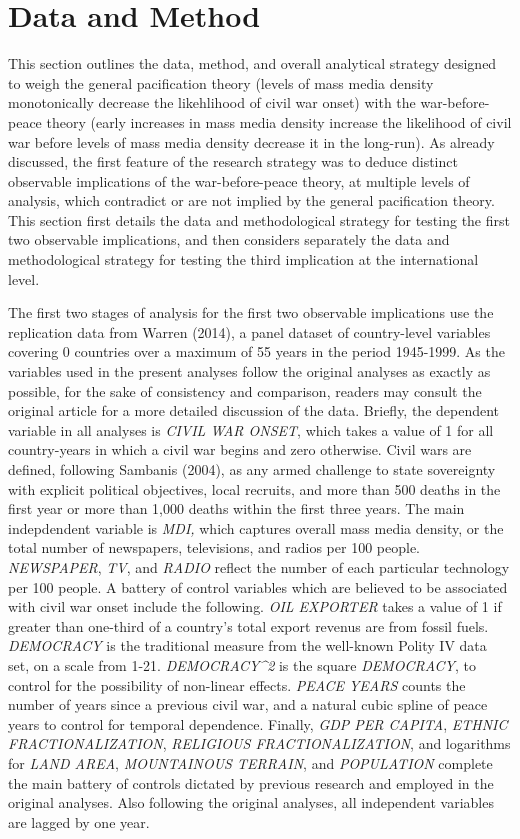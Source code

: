 \documentclass[11pt,article,oneside]{memoir}
\begin{document}
\section{Data and Method}\label{data-and-method}

This section outlines the data, method, and overall analytical strategy
designed to weigh the general pacification theory (levels of mass media
density monotonically decrease the likehlihood of civil war onset) with
the war-before-peace theory (early increases in mass media density
increase the likelihood of civil war before levels of mass media density
decrease it in the long-run). As already discussed, the first feature of
the research strategy was to deduce distinct observable implications of
the war-before-peace theory, at multiple levels of analysis, which
contradict or are not implied by the general pacification theory. This
section first details the data and methodological strategy for testing
the first two observable implications, and then considers separately the
data and methodological strategy for testing the third implication at
the international level.

The first two stages of analysis for the first two observable
implications use the replication data from Warren (2014), a panel
dataset of country-level variables covering 0 countries over a maximum
of 55 years in the period 1945-1999. As the variables used in the
present analyses follow the original analyses as exactly as possible,
for the sake of consistency and comparison, readers may consult the
original article for a more detailed discussion of the data. Briefly,
the dependent variable in all analyses is \emph{CIVIL WAR ONSET}, which
takes a value of 1 for all country-years in which a civil war begins and
zero otherwise. Civil wars are defined, following Sambanis (2004), as
any armed challenge to state sovereignty with explicit political
objectives, local recruits, and more than 500 deaths in the first year
or more than 1,000 deaths within the first three years. The main
indepdendent variable is \emph{MDI,} which captures overall mass media
density, or the total number of newspapers, televisions, and radios per
100 people. \emph{NEWSPAPER}, \emph{TV}, and \emph{RADIO} reflect the
number of each particular technology per 100 people. A battery of
control variables which are believed to be associated with civil war
onset include the following. \emph{OIL EXPORTER} takes a value of 1 if
greater than one-third of a country's total export revenus are from
fossil fuels. \emph{DEMOCRACY} is the traditional measure from the
well-known Polity IV data set, on a scale from 1-21.
\emph{DEMOCRACY\^{}2} is the square \emph{DEMOCRACY}, to control for the
possibility of non-linear effects. \emph{PEACE YEARS} counts the number
of years since a previous civil war, and a natural cubic spline of peace
years to control for temporal dependence. Finally, \emph{GDP PER
CAPITA}, \emph{ETHNIC FRACTIONALIZATION}, \emph{RELIGIOUS
FRACTIONALIZATION}, and logarithms for \emph{LAND AREA},
\emph{MOUNTAINOUS TERRAIN}, and \emph{POPULATION} complete the main
battery of controls dictated by previous research and employed in the
original analyses. Also following the original analyses, all independent
variables are lagged by one year.
\end{document}
